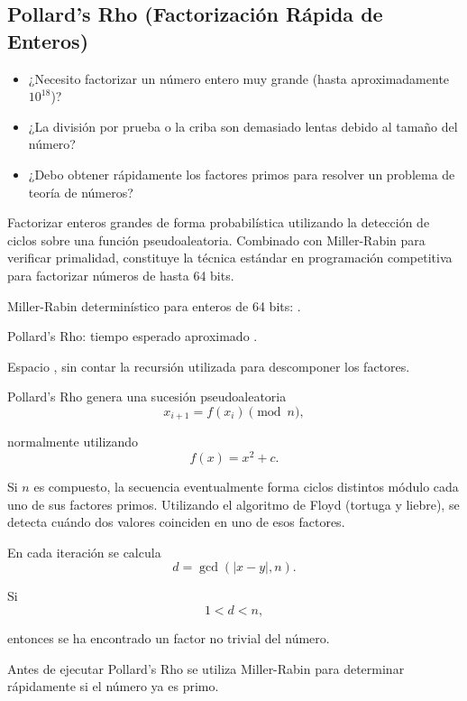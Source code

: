 \subsection{Pollard's Rho (Factorización Rápida de Enteros)}


\begin{itemize}
\item ¿Necesito factorizar un número entero muy grande (hasta aproximadamente \(10^{18}\))?
\item ¿La división por prueba o la criba son demasiado lentas debido al tamaño del número?
\item ¿Debo obtener rápidamente los factores primos para resolver un problema de teoría de números?
\end{itemize}


Factorizar enteros grandes de forma probabilística utilizando la detección de ciclos sobre una función pseudoaleatoria. Combinado con Miller-Rabin para verificar primalidad, constituye la técnica estándar en programación competitiva para factorizar números de hasta 64 bits.


Miller-Rabin determinístico para enteros de 64 bits: .

Pollard's Rho: tiempo esperado aproximado .

Espacio , sin contar la recursión utilizada para descomponer los factores.


Pollard's Rho genera una sucesión pseudoaleatoria
\[
x_{i+1}=f(x_i)\pmod n,
\]

normalmente utilizando
\[
f(x)=x^2+c.
\]

Si \(n\) es compuesto, la secuencia eventualmente forma ciclos distintos módulo cada uno de sus factores primos. Utilizando el algoritmo de Floyd (tortuga y liebre), se detecta cuándo dos valores coinciden en uno de esos factores.

En cada iteración se calcula
\[
d=\gcd(|x-y|,n).
\]

Si
\[
1<d<n,
\]

entonces se ha encontrado un factor no trivial del número.

Antes de ejecutar Pollard's Rho se utiliza Miller-Rabin para determinar rápidamente si el número ya es primo.

